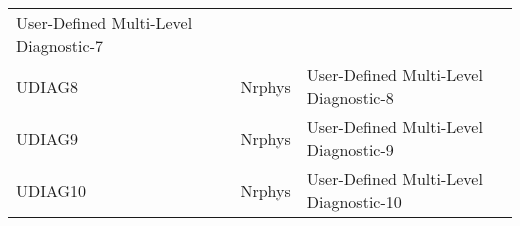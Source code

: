 \begin{table}
\begin{tabular}{llll}
\begin{minipage}[t]{3in}
          {User-Defined Multi-Level Diagnostic-7} 
         \end{minipage}\\
 UDIAG8   &             &    Nrphys  
         &\begin{minipage}[t]{3in}
          {User-Defined Multi-Level Diagnostic-8} 
         \end{minipage}\\
 UDIAG9   &             &    Nrphys  
         &\begin{minipage}[t]{3in}
          {User-Defined Multi-Level Diagnostic-9} 
         \end{minipage}\\
 UDIAG10  &             &    Nrphys  
         &\begin{minipage}[t]{3in}
          {User-Defined Multi-Level Diagnostic-10} 
         \end{minipage}\\
\end{tabular}
\end{table}
\vspace{1.5in}
\vfill
